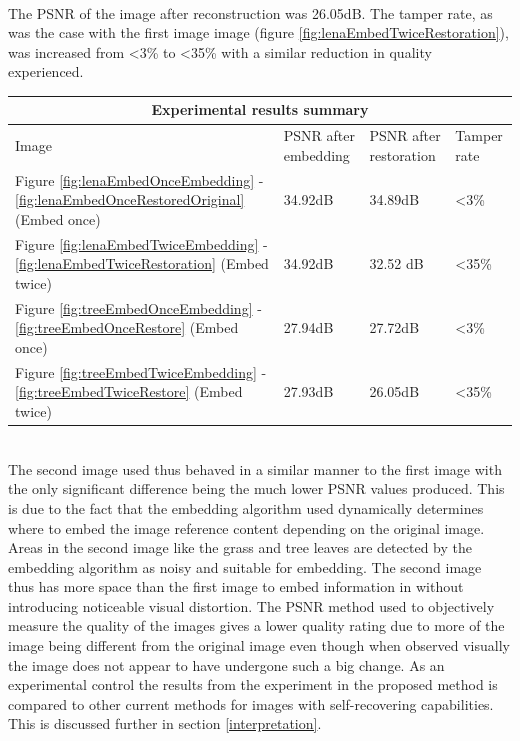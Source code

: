 \documentclass[12pt]{article}
\begin{document}
\hspace{0pt} \\
The PSNR of the image after reconstruction was 26.05dB.
The tamper rate, as was the case with the first image image (figure \ref{fig:lenaEmbedTwiceRestoration}), was increased from \textless 3\% to \textless 35\% with a similar reduction in quality experienced.
\begin{center}
  \begin{tabular}{| l | l | l | l |}
    \hline
    \multicolumn{4}{|c|}{Experimental results summary} \\
    \hline
    Image & PSNR after embedding & PSNR after restoration & Tamper rate \\ \hline
    Figure \ref{fig:lenaEmbedOnceEmbedding} - \ref{fig:lenaEmbedOnceRestoredOriginal} (Embed once) & 34.92dB & 34.89dB & \textless 3\% \\ \hline
    Figure \ref{fig:lenaEmbedTwiceEmbedding} - \ref{fig:lenaEmbedTwiceRestoration} (Embed twice) & 34.92dB & 32.52 dB & \textless 35\% \\ \hline
    Figure \ref{fig:treeEmbedOnceEmbedding} - \ref{fig:treeEmbedOnceRestore} (Embed once) & 27.94dB & 27.72dB & \textless 3\% \\ \hline
    Figure \ref{fig:treeEmbedTwiceEmbedding} - \ref{fig:treeEmbedTwiceRestore} (Embed twice) & 27.93dB & 26.05dB & \textless 35\% \\ \hline
    \hline
  \end{tabular}
\end{center}

\hspace{0pt} \\
The second image used thus behaved in a similar manner to the first image with the only significant difference being the much lower PSNR values produced.
This is due to the fact that the embedding algorithm used dynamically determines where to embed the image reference content depending on the original image.
Areas in the second image like the grass and tree leaves are detected by the embedding algorithm as noisy and suitable for embedding. 
The second image thus has more space than the first image to embed information in without introducing noticeable visual distortion.
The PSNR method used to objectively measure the quality of the images gives a lower quality rating due to more of the image being different from the original image even though when observed visually the image does not appear to have undergone such a big change. 
  As an experimental control the results from the experiment in the proposed method is compared to other current methods for images with self-recovering capabilities.
This is discussed further in  section \ref{interpretation}.
\end{document}
